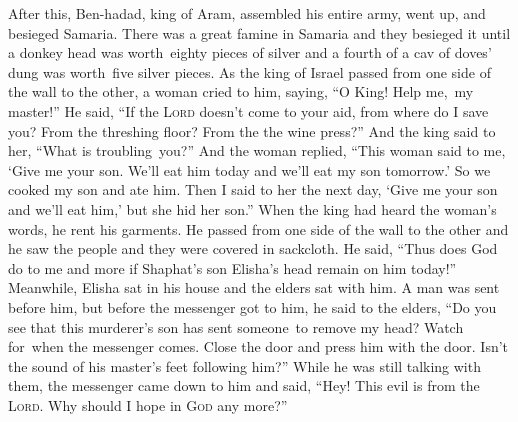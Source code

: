 \begin{inparaenum}
   After this, Ben-hadad, king of Aram, assembled his entire army, went up, and besieged Samaria.%
   There was a great famine in Samaria and they besieged it until a donkey head was worth\understood\ eighty pieces of silver and a fourth of a cav of doves' dung was worth\understood\ five silver pieces.%
   As the king of Israel passed from one side of the wall to the other, a woman cried to him, saying, ``O King! Help me,\understood\ my master!''%
   He said, ``If the \textsc{Lord} doesn't come to your aid, from where do I save you? From the threshing floor? From the the wine press?''%
   And the king said to her, ``What is troubling\understood\ you?'' And the woman replied, ``This woman said to me, `Give me your son. We'll eat him today and we'll eat my son tomorrow.'%
   So we cooked my son and ate him. Then I said to her the next day, `Give me your son and we'll eat him,' but she hid her son.''%
   When the king had heard the woman's words, he rent his garments. He passed from one side of the wall to the other and he saw the people and they were covered in sackcloth.%
   He said, ``Thus does God do to me and more if Shaphat's son Elisha's head remain on him today!''%
   Meanwhile, Elisha sat in his house and the elders sat with him. A man was sent before him, but before the messenger got to him, he said to the elders, ``Do you see that this murderer's son has sent someone\understood\ to remove my head? Watch for\understood\ when the messenger comes. Close the door and press him with the door. Isn't the sound of his master's feet following him?''%
   While he was still talking with them, the messenger came down to him and said, ``Hey! This evil is from the \textsc{Lord}. Why should I hope in \textsc{God} any more?''%
\end{inparaenum}
